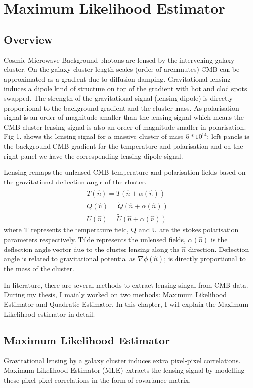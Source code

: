 \chapter{Maximum Likelihood Estimator}
\label{ch:MLE}
\section{Overview}
Cosmic Microwave Background photons are lensed by the intervening galaxy cluster. 
On the galaxy cluster length scales (order of arcminutes) CMB can be approximated as a gradient due to diffusion damping. 
Gravitational lensing induces a dipole kind of structure on top of the gradient with hot and clod spots swapped. 
The strength of the gravitational signal (lensing dipole) is directly proportional to the background gradient and the cluster mass. 
As polarisation signal is an order of magnitude smaller than the lensing signal which means the CMB-cluster lensing signal is also an order of magnitude smaller in polarisation. 
Fig 1. shows the lensing signal for a massive cluster of mass $5*10^{14}$\msolar; left panels is the background CMB gradient for the temperature and polarisation and on the right panel we have the corresponding lensing dipole signal.

Lensing remaps the unlensed CMB temperature and polarisation fields based on the gravitational deflection angle of the cluster. 
\begin{eqnarray}
T(\hat{n}) = \tilde{T}(\hat{n} + \alpha(\hat{n}))\\
Q(\hat{n}) = \tilde{Q}(\hat{n} + \alpha(\hat{n}))\\
U(\hat{n}) =  \tilde{U}(\hat{n} + \alpha(\hat{n}))
\end{eqnarray}
where T represents the temperature field, Q and U are the stokes polarisation parameters respectively. 
Tilde represents the unlensed fields, $\alpha(\hat{n})$ is the deflection angle vector due to the cluster lensing along the $\hat{n}$ direction. 
Deflection angle is related to gravitational potential as $\nabla \phi (\hat{n})$; is directly proportional to the mass of the cluster.

In literature, there are several methods to extract lensing singal from CMB data. 
During my thesis, I mainly worked on two methods: Maximum Likelihood Estimator and Quadratic Estimator. 
In this chapter, I will explain the Maximum Likelihood estimator in detail. 
\section{Maximum Likelihood Estimator}
Gravitational lensing by a galaxy cluster induces extra pixel-pixel correlations. 
Maximum Likelihood Estimator (MLE) extracts the lensing signal by modelling these pixel-pixel correlations in the form of covariance matrix.


